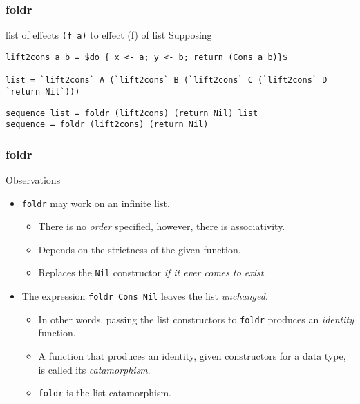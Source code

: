 \begin{frame}[fragile]
\frametitle{foldr}
\begin{block}{list of effects \lstinline{(f a)} to effect (f) of list}
Supposing
\begin{lstlisting}[style=haskell,basicstyle=\tiny\ttfamily,mathescape]
lift2cons a b = $do { x <- a; y <- b; return (Cons a b)}$

list = `lift2cons` A (`lift2cons` B (`lift2cons` C (`lift2cons` D `return Nil`)))
\end{lstlisting}
\end{block}
\begin{lstlisting}[style=haskell,basicstyle=\scriptsize\ttfamily,mathescape]
sequence list = foldr (lift2cons) (return Nil) list
sequence = foldr (lift2cons) (return Nil)
\end{lstlisting}
\end{frame}

\begin{frame}[fragile]
\frametitle{foldr}
\begin{block}{Observations}
\begin{itemize}
\item \lstinline[basicstyle=\ttfamily]$foldr$ may work on an infinite list.
  \begin{itemize}
  \item There is no \emph{order} specified, however, there is associativity.
  \item Depends on the strictness of the given function.
  \item Replaces the \lstinline[basicstyle=\ttfamily]$Nil$ constructor \emph{if it ever comes to exist}.
  \end{itemize}
\item The expression \lstinline[basicstyle=\ttfamily]$foldr Cons Nil$ leaves the list \emph{unchanged}.
  \begin{itemize}
  \item In other words, passing the list constructors to \lstinline[basicstyle=\ttfamily]$foldr$ produces an \emph{identity} function.
  \item A function that produces an identity, given constructors for a data type, is called its \emph{catamorphism}.
  \item \lstinline[basicstyle=\ttfamily]$foldr$ is the list catamorphism.
  \end{itemize}
\end{itemize}
\end{block}
\end{frame}
